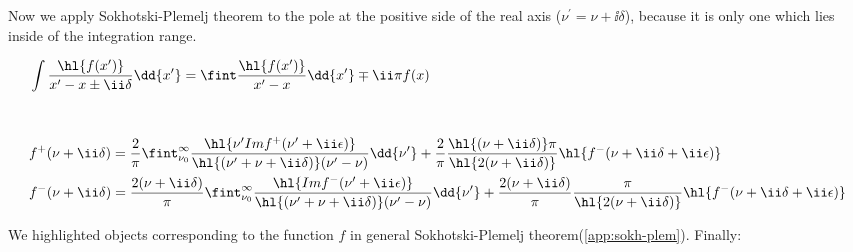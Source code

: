 Now we apply Sokhotski-Plemelj theorem to the pole at the positive side of the real axis ($\nu^\prime = \nu+\ii \delta$), because it is only one which lies inside of the integration range.

\begin{align}
    &\int \frac{\hl{f(x^\prime)}}{x^\prime - x \pm \ii \delta} \dd{x^\prime} = \fint \frac{\hl{f(x^\prime)}}{x^\prime - x} \dd{x^\prime} \mp \ii \pi f(x) \label{app:sokh-plem} \\[1cm]
    &f^{+}(\nu+\ii \delta) = \frac{2}{\pi} \fint_{\nu_0}^{\infty} \frac{\hl{\nu^\prime Im f^{+}(\nu^\prime+\ii \epsilon)}}{\hl{(\nu^\prime + \nu + \ii \delta)}(\nu^\prime - \nu)} \dd{\nu^\prime} + \frac{2}{\pi} \frac{\hl{(\nu + \ii \delta)} \pi}{\hl{2 (\nu + \ii \delta)}} \hl{f^{-}(\nu + \ii \delta + \ii \epsilon)} \\
    &f^{-}(\nu+\ii \delta) = \frac{2 (\nu+\ii \delta)}{\pi} \fint_{\nu_0}^{\infty} \frac{\hl{Im f^{-}(\nu^\prime+\ii \epsilon)}}{\hl{(\nu^\prime + \nu + \ii \delta)}(\nu^\prime - \nu)} \dd{\nu^\prime} + \frac{2 (\nu+\ii \delta)}{\pi} \frac{\pi}{\hl{2 (\nu + \ii \delta)}} \hl{f^{-}(\nu + \ii \delta + \ii \epsilon)}
\end{align}

We highlighted objects corresponding to the function $f$ in general Sokhotski-Plemelj theorem(\cref{app:sokh-plem}). Finally: \\[1cm]

